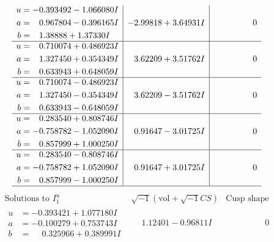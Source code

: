 \documentclass[1p]{elsarticle_modified}
\theoremstyle{definition}
\newcommand{\I}{\sqrt{-1}}
\begin{document}
$$\begin{array}{c|c|c}
\begin{aligned}
u &= -0.393492 - 1.066080 I \\
a &= \phantom{-}0.967804 - 0.396165 I \\
b &= \phantom{-}1.38888 + 1.37330 I\end{aligned}
 & -2.99818 + 3.64931 I & \phantom{-0.000000 } 0 \\ \hline\begin{aligned}
u &= \phantom{-}0.710074 + 0.486923 I \\
a &= \phantom{-}1.327450 + 0.354349 I \\
b &= \phantom{-}0.633943 + 0.648059 I\end{aligned}
 & \phantom{-}3.62209 + 3.51762 I & \phantom{-0.000000 } 0 \\ \hline\begin{aligned}
u &= \phantom{-}0.710074 - 0.486923 I \\
a &= \phantom{-}1.327450 - 0.354349 I \\
b &= \phantom{-}0.633943 - 0.648059 I\end{aligned}
 & \phantom{-}3.62209 - 3.51762 I & \phantom{-0.000000 } 0 \\ \hline\begin{aligned}
u &= \phantom{-}0.283540 + 0.808746 I \\
a &= -0.758782 - 1.052090 I \\
b &= \phantom{-}0.857999 + 1.000250 I\end{aligned}
 & \phantom{-}0.91647 - 3.01725 I & \phantom{-0.000000 } 0 \\ \hline\begin{aligned}
u &= \phantom{-}0.283540 - 0.808746 I \\
a &= -0.758782 + 1.052090 I \\
b &= \phantom{-}0.857999 - 1.000250 I\end{aligned}
 & \phantom{-}0.91647 + 3.01725 I & \phantom{-0.000000 } 0\\
 \hline 
 \end{array}$$\newpage$$\begin{array}{c|c|c}  
\text{Solutions to }I^u_{1}& \I (\text{vol} + \sqrt{-1}CS) & \text{Cusp shape}\\
 \hline 
\begin{aligned}
u &= -0.393421 + 1.077180 I \\
a &= -0.100279 + 0.753743 I \\
b &= \phantom{-}0.325966 + 0.389991 I\end{aligned}
 & \phantom{-}1.12401 - 0.96811 I & \phantom{-0.000000 } 0 \\ \hline\begin{aligned}

\end{aligned}
\end{array}$$
\end{document}
